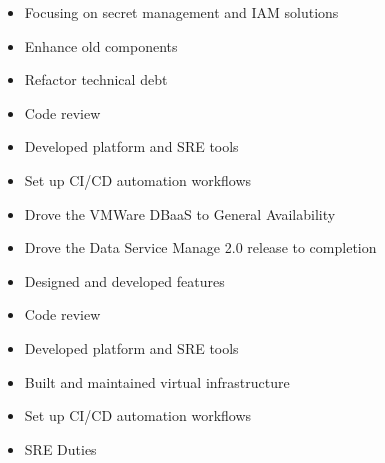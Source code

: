\documentclass[10pt,a4paper,ragged2e,withhyper]{altacv}
\begin{document}


\makecvheader



\begin{itemize}
\item Focusing on secret management and IAM solutions
\item Enhance old components
\item Refactor technical debt
\item Code review
\item Developed platform and SRE tools
\item Set up CI/CD automation workflows
\end{itemize}
\divider

\begin{itemize}
\item Drove the VMWare DBaaS to General Availability
\item Drove the Data Service Manage 2.0 release to completion
\item Designed and developed features
\item Code review
\item Developed platform and SRE tools
\item Built and maintained virtual infrastructure
\item Set up CI/CD automation workflows
\item SRE Duties
\end{itemize}
\divider
\end{document}
